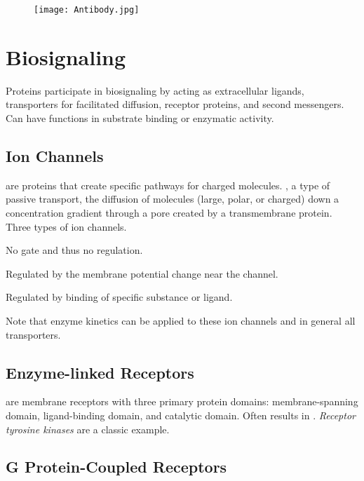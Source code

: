 \documentclass[../Bio_chemistryReview.tex]{subfiles}
\begin{document}
\begin{figure}[h]
  \centering
  \texttt{[image: Antibody.jpg]}
\end{figure}

\section{Biosignaling\supdag}

Proteins participate in biosignaling by acting as extracellular ligands,
transporters for facilitated diffusion, receptor proteins, and second
messengers. Can have functions in substrate binding or enzymatic activity.

\subsection{Ion Channels\supdag}

 are proteins that create specific pathways for charged
molecules. , a type of passive transport, the
diffusion of molecules (large, polar, or charged) down a concentration gradient
through a pore created by a transmembrane protein. Three types of ion channels.

\begin{description}
  \item {} No gate and thus no regulation.
  \item {} 	Regulated by the membrane potential
    change near the channel.  
  \item {} Regulated by binding of specific substance
    or ligand.
\end{description}

Note that enzyme kinetics can be applied to these ion channels and in general
all transporters.

\subsection{Enzyme-linked Receptors\supdag}

 are membrane receptors with three primary
protein domains: membrane-spanning domain, ligand-binding domain, and catalytic
domain. Often results in . \emph{Receptor
tyrosine kinases} are a classic example.

\subsection{G Protein-Coupled Receptors\supdag}
\end{document}
